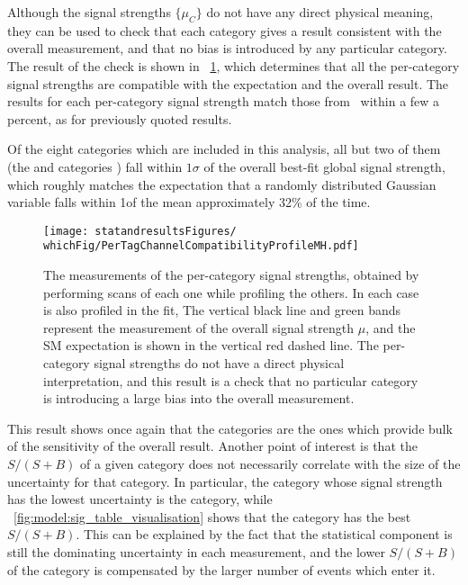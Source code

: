 Although the signal strengths $\{\mu_C\}$ do not have any direct physical meaning, they can be used to check that each category gives a result consistent with the overall measurement, and that no bias is introduced by any particular category. The result of the check is shown in \Fig~\ref{fig:statandresults:mu_per_tag}, which determines that all the per-category signal strengths are compatible with the \SM expectation and the overall result. The results for each per-category signal strength match those from~\cite{CMS-PAS-HIG-16-020} within a few a percent, as for previously quoted results. 

Of the eight categories which are included in this analysis, all but two of them (the  and  categories ) fall within $1\sigma$ of the overall best-fit global signal strength, which roughly matches the expectation that a randomly distributed Gaussian variable falls within 1\sigma of the mean approximately 32\% of the time.

\begin{figure}[ht!]
\centering
\texttt{[image: statandresultsFigures/\\whichFig/PerTagChannelCompatibilityProfileMH.pdf]} 
\caption{The measurements of the per-category signal strengths, obtained by performing \DNLL scans of each one while profiling the others. In each case \mH is also profiled in the fit, The vertical black line and green bands represent the measurement of the overall signal strength $\mu$, and the SM expectation is shown in the vertical red dashed line. The per-category signal strengths do not have a direct physical interpretation, and this result is a check that no particular category is introducing a large bias into the overall measurement.}

\label{fig:statandresults:mu_per_tag}

\end{figure}

This result shows once again that the \Untagged categories are the ones which provide bulk of the sensitivity of the overall result. Another point of interest is that the $S/(S+B)$ of a given category does not necessarily correlate with the size of the uncertainty for that category. In particular, the category whose signal strength has the lowest uncertainty is the  category, while \Fig~\ref{fig:model:sig_table_visualisation} shows that the  category has the best $S/(S+B)$. This can be explained by the fact that the statistical component is still the dominating uncertainty in each measurement, and the lower $S/(S+B)$ of the  category is compensated by the larger number of events which enter it. 

